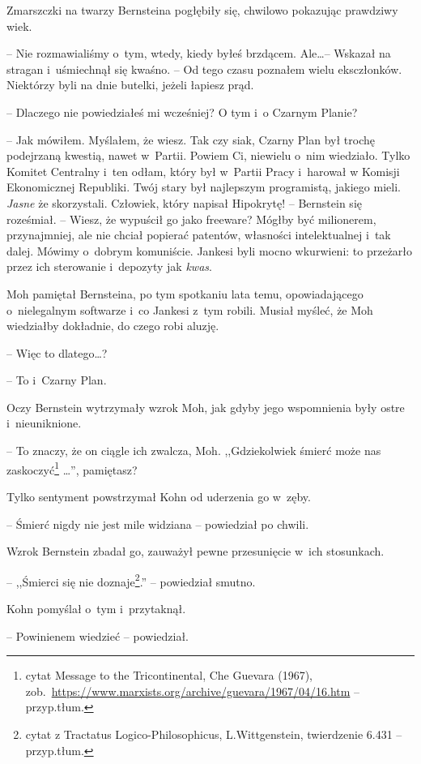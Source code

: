 \documentclass[oneside,polish,11pt,sfheadings]{mwbk}
\begin{document}
Zmarszczki na twarzy Bernsteina pogłębiły się, chwilowo pokazując
prawdziwy wiek. 

-- Nie rozmawialiśmy o~tym, wtedy, kiedy byłeś brzdącem.
Ale\ldots -- Wskazał na stragan i~uśmiechnął się kwaśno. -- Od tego czasu
poznałem wielu eksczłonków. Niektórzy byli na dnie butelki, jeżeli
łapiesz prąd.

-- Dlaczego nie powiedziałeś mi wcześniej? O tym i~o Czarnym Planie?

-- Jak mówiłem. Myślałem, że wiesz. Tak czy siak, Czarny Plan był trochę
podejrzaną kwestią, nawet w~Partii. Powiem Ci, niewielu o~nim wiedziało.
Tylko Komitet Centralny i~ten odłam, który był w~Partii Pracy i~harował
w Komisji Ekonomicznej Republiki. Twój stary był najlepszym programistą,
jakiego mieli. \emph{Jasne} że skorzystali. Człowiek, który napisał
Hipokrytę! -- Bernstein się roześmiał. -- Wiesz, że wypuścił go jako
freeware? Mógłby być milionerem, przynajmniej, ale nie chciał popierać
patentów, własności intelektualnej i~tak dalej. Mówimy o~dobrym
komuniście. Jankesi byli mocno wkurwieni: to przeżarło przez ich
sterowanie i~depozyty jak \emph{kwas}.

Moh pamiętał Bernsteina, po tym spotkaniu lata temu, opowiadającego o~nielegalnym softwarze i~co Jankesi z~tym robili. Musiał myśleć, że Moh
wiedziałby dokładnie, do czego robi aluzję.

-- Więc to dlatego\ldots ?

-- To i~Czarny Plan.

Oczy Bernstein wytrzymały wzrok Moh, jak gdyby jego wspomnienia były
ostre i~nieuniknione. 

-- To znaczy, że on ciągle ich zwalcza, Moh.
,,Gdziekolwiek śmierć może nas zaskoczyć\footnote{cytat
Message to the Tricontinental, Che Guevara (1967),
zob.~\url{https://www.marxists.org/archive/guevara/1967/04/16.htm}
-- przyp.tłum.} \ldots '', pamiętasz? 

Tylko sentyment powstrzymał Kohn od uderzenia go w~zęby.

-- Śmierć nigdy nie jest mile widziana -- powiedział po chwili.

Wzrok Bernstein zbadał go, zauważył pewne przesunięcie w~ich stosunkach.

-- ,,Śmierci się nie doznaje\footnote{cytat z Tractatus
Logico-Philosophicus, L.Wittgenstein, twierdzenie 6.431 -- przyp.tłum.}.'' -- powiedział smutno. 

Kohn pomyślał o~tym i~przytaknął.

-- Powinienem wiedzieć -- powiedział.
\end{document}
